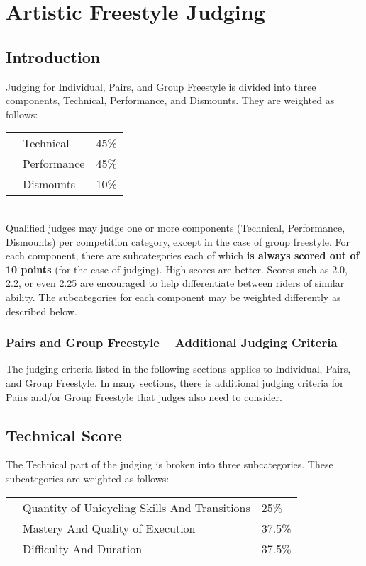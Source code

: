 \chapter{Artistic Freestyle Judging}
\section{Introduction}
Judging for Individual, Pairs, and Group Freestyle is divided into three components, Technical, Performance, and Dismounts.
They are weighted as follows:

\begin{tabular}{l l l}
 & Technical & 45\% \\
 & Performance & 45\% \\
 & Dismounts & 10\% \\
\end{tabular}\\

Qualified judges may judge one or more components (Technical, Performance, Dismounts) per competition category, except in the case of group freestyle.
For each component, there are subcategories each of which \textbf{is always scored out of 10 points} (for the ease of judging).
High scores are better.
Scores such as 2.0, 2.2, or even 2.25 are encouraged to help differentiate between riders of similar ability.
The subcategories for each component may be weighted differently as described below.

\subsection{Pairs and Group Freestyle -- Additional Judging Criteria}
The judging criteria listed in the following sections applies to Individual, Pairs, and Group Freestyle. In many sections, there is additional judging criteria for Pairs and/or Group Freestyle that judges also need to consider.

\section{Technical Score \label{sec:freestyle_technical-score}}
The Technical part of the judging is broken into three subcategories.
These subcategories are weighted as follows:

\begin{tabular}{l l l}
 & Quantity of Unicycling Skills And Transitions & 25\% \\
 & Mastery And Quality of Execution & 37.5\% \\
 & Difficulty And Duration & 37.5\% \\
\end{tabular}

